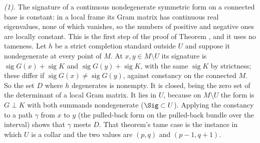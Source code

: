 \emph{(1).} The signature of a continuous nondegenerate symmetric form on a connected base is constant: in a local frame its Gram matrix has continuous real eigenvalues, none of which vanishes, so the numbers of positive and negative ones are locally constant. This is the first step of the proof of Theorem , and it uses no tameness. Let $h$ be a strict completion standard outside $U$ and suppose it nondegenerate at every point of $M$. At $x, y \in M \setminus U$ its signature is $\operatorname{sig} G(x) + \operatorname{sig} K$ and $\operatorname{sig} G(y) + \operatorname{sig} K$, with the same $\operatorname{sig} K$ by strictness; these differ if $\operatorname{sig} G(x) \neq \operatorname{sig} G(y)$, against constancy on the connected $M$. So the set $D$ where $h$ degenerates is nonempty. It is closed, being the zero set of the determinant of a local Gram matrix. It lies in $U$, because on $M \setminus U$ the form is $G \perp K$ with both summands nondegenerate ($\Sig \subset U$). Applying the constancy to a path $\gamma$ from $x$ to $y$ (the pulled-back form on the pulled-back bundle over the interval) shows that $\gamma$ meets $D$. That theorem's tame case is the instance in which $U$ is a collar and the two values are $(p,q)$ and $(p-1,q+1)$.

